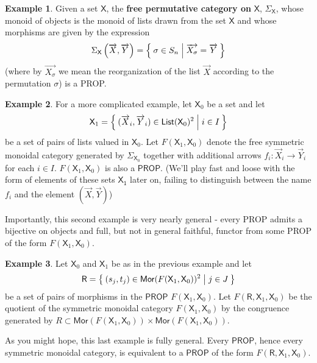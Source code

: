 \documentclass[pra,floatfix,
amsmath,superscriptaddress, 12pt]{article}
\theoremstyle{definition}
\newtheorem*{example}{Example}
\newcommand{\msf}[1]{\mathsf{#1}}
\begin{document}
\begin{example}
Given a set $\mathsf{X}$, the \textbf{free permutative category on} $\mathsf{X}$, $\Sigma_{\mathsf{X}}$, whose monoid of objects is the monoid of lists drawn from the set $\mathsf{X}$ and whose morphisms are given by the expression
\[
    \Sigma_{\mathsf{X}}\left(\overrightarrow{X},\overrightarrow{Y}\right)
    =
    \Set{\sigma \in S_{n} | \overrightarrow{X_\sigma}=\overrightarrow{Y}}
\]
(where by $\overrightarrow{X_\sigma}$ we mean the reorganization of the list $\overrightarrow{X}$ according to the permutation $\sigma$) is a \textsf{PROP}.
\end{example}

\begin{example}
For a more complicated example, let $\mathsf{X}_0$ be a set and let
\[
    \msf{X}_1
    =
    \Set{(\overrightarrow{X}_i,\overrightarrow{Y}_i) \in \mathsf{List}(\mathsf{X}_0)^2| i \in I}
\]
be a set of pairs of lists valued in $\mathsf{X}_0$. Let $F(\msf{X}_1,\msf{X}_0)$ denote the free symmetric monoidal category generated by $\Sigma_{\msf{X}_0}$ together with additional arrows $f_{i}:\overrightarrow{X}_i \longrightarrow \overrightarrow{Y}_i$ for each $i\in I$. $F(\msf{X}_1,\msf{X}_0)$ is also a $\msf{PROP}$. (We'll play fast and loose with the form of elements of these sets $\msf{X_1}$ later on, failing to distinguish between the name $f_i$ and the element $(\overrightarrow{X},\overrightarrow{Y})$)
\end{example}

Importantly, this second example is very nearly general - every \textsf{PROP} admits a bijective on objects and full, but not in general faithful, functor from some \textsf{PROP} of the form $F(\msf{X}_1,\msf{X}_0)$.

\begin{example}
 Let  $\msf{X}_0$ and $\msf{X}_1$ be as in the previous example and let
 \[
    \msf{R}=\Set{ (s_j,t_j) \in \mathsf{Mor}(F(\msf{X}_1,\msf{X}_0))^2 | j \in J}
 \]
 be a set of pairs of morphisms in the $\mathsf{PROP}$ $F(\msf{X}_1,\msf{X}_0)$. Let $F(\msf{R},\msf{X}_1,\msf{X}_0)$ be the quotient of the symmetric monoidal category $F(\msf{X}_1,\msf{X}_0)$ by the congruence generated by $R \subset \mathsf{Mor}(F(\msf{X}_1,\msf{X}_0)) \times \mathsf{Mor}(F(\msf{X}_1,\msf{X}_0))$.
\end{example}

As you might hope, this last example is fully general. Every $\mathsf{PROP}$, hence every symmetric monoidal category, is equivalent to a $\mathsf{PROP}$ of the form $F(\msf{R},\msf{X}_1,\msf{X}_0)$.
\end{document}
